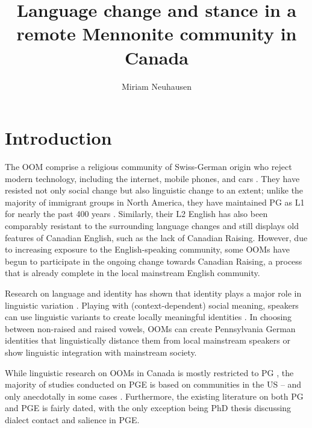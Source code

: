 \documentclass[output=paper]{langscibook}
\author{Miriam Neuhausen \orcid{0009-0007-0260-531X} \affiliation{University of Freiburg}}
\title{Language change and stance in a remote Mennonite community in Canada}
\begin{document}
\maketitle

\section{Introduction}
The \gls*{OOM} comprise a religious community of Swiss-German origin \citep[72]{burridge_throw_1998} who reject modern technology, including the internet, mobile phones, and cars \citep[39–41]{epp_mennonites_2012}. They have resisted not only social change but also linguistic change to an extent; unlike the majority of immigrant groups in North America, they have maintained \gls*{PG} as L1 for nearly the past 400 years \citep[203]{burridge_steel_2002}. Similarly, their L2 English has also been comparably resistant to the surrounding language changes and still displays old features of Canadian English, such as the lack of Canadian Raising. However, due to increasing exposure to the English-speaking community, some \glspl*{OOM} have begun to participate in the ongoing change towards Canadian Raising, a process that is already complete in the local mainstream English community. 
	

Research on language and identity has shown that identity plays a major role in linguistic variation \citep{eckert_linguistic_2000,johnstone_mobility_2006,nycz_stylistic_2018}. Playing with (context-dependent) social meaning, speakers can use linguistic variants to create locally meaningful identities \citep{podesva_phonation_2007}. In choosing between non-raised and raised vowels, \glspl*{OOM} can create Pennsylvania German identities that linguistically distance them from local mainstream speakers or show linguistic integration with mainstream society. 

While linguistic research on \glspl*{OOM} in Canada is mostly restricted to \gls*{PG} \citep{richter_phonemic_1969,burridge_creating_1992}, the majority of studies conducted on \gls*{PGE} is based on communities in the US \citep{huffines_english_1984,huffines_intonation_1986,kopp_phonologie_1997,kopp_phonology_1999} – and only anecdotally in some cases \citep{springer_study_1980,shields_germanisms_1987}. Furthermore, the existing literature on both \gls*{PG} and \gls*{PGE} is fairly dated, with the only exception being  PhD thesis discussing dialect contact and salience in \gls*{PGE}.
\end{document}
